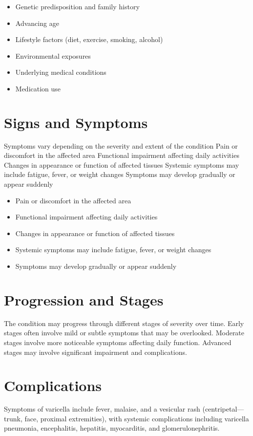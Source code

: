 \begin{itemize}[noitemsep]
  \item Genetic predisposition and family history
  \item Advancing age
  \item Lifestyle factors (diet, exercise, smoking, alcohol)
  \item Environmental exposures
  \item Underlying medical conditions
  \item Medication use
\end{itemize}
\section{Signs and Symptoms}
Symptoms vary depending on the severity and extent of the condition Pain or discomfort in the affected area Functional impairment affecting daily activities Changes in appearance or function of affected tissues Systemic symptoms may include fatigue, fever, or weight changes Symptoms may develop gradually or appear suddenly

\begin{itemize}[noitemsep]
  \item Pain or discomfort in the affected area
  \item Functional impairment affecting daily activities
  \item Changes in appearance or function of affected tissues
  \item Systemic symptoms may include fatigue, fever, or weight changes
  \item Symptoms may develop gradually or appear suddenly
\end{itemize}
\section{Progression and Stages}
The condition may progress through different stages of severity over time. Early stages often involve mild or subtle symptoms that may be overlooked. Moderate stages involve more noticeable symptoms affecting daily function. Advanced stages may involve significant impairment and complications.
\section{Complications}
Symptoms of varicella include fever, malaise, and a vesicular rash (centripetal---trunk, face, proximal extremities), with systemic complications including varicella pneumonia, encephalitis, hepatitis, myocarditis, and glomerulonephritis.

